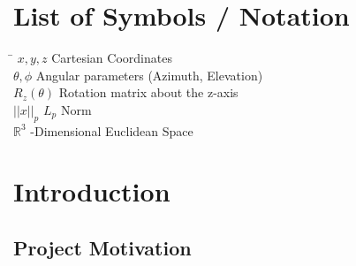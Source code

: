 \documentclass[12pt, a4paper]{report}
\begin{document}
\clearpage

\tableofcontents
\clearpage

\listoffigures
\clearpage

\listoftables
\clearpage

\chapter*{List of Symbols / Notation}
\begin{tabbing}
    \hspace*{3cm} \= \kill
    $x, y, z$ \> Cartesian Coordinates \\
    $\theta, \phi$ \> Angular parameters (Azimuth, Elevation) \\
    $R_{z}(\theta)$ \> Rotation matrix about the z-axis \\
    $||x||_p$ \> $L_p$ Norm \\
    $\mathbb{R}^3$ -Dimensional Euclidean Space
\end{tabbing}

\clearpage


\chapter{Introduction}

\section{Project Motivation}
\end{document}

